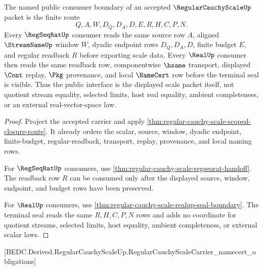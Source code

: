 \begin{theorem}
\label{thm:regular-cauchy-scale-public-consumer-boundary}
The named public consumer boundary of an accepted $\RegularCauchyScaleUp$ packet is the finite route
$$
Q,A,W,D_Q,D_A,D,E,R,H,C,P,N.
$$
Every $\RegSeqRatUp$ consumer reads the same source row $A$, aligned $\StreamNameUp$ window $W$, dyadic endpoint rows $D_Q,D_A,D$, finite budget $E$, and regular readback $R$ before exporting scale data. Every $\RealUp$ consumer then reads the same readback row, componentwise $\hsame$ transport, displayed $\Cont$ replay, $\Pkg$ provenance, and local $\NameCert$ row before the terminal seal is visible. Thus the public interface is the displayed scale packet itself, not quotient stream equality, selected limits, host real equality, ambient completeness, or an external real-vector-space law.
\end{theorem}
\begin{proof}
Project the accepted carrier and apply \autoref{thm:regular-cauchy-scale-scoped-closure-route}. It already orders the scalar, source, window, dyadic endpoint, finite-budget, regular-readback, transport, replay, provenance, and local naming rows.

For $\RegSeqRatUp$ consumers, use \autoref{thm:regular-cauchy-scale-regseqrat-handoff}. The readback row $R$ can be consumed only after the displayed source, window, endpoint, and budget rows have been preserved.

For $\RealUp$ consumers, use \autoref{thm:regular-cauchy-scale-realup-seal-boundary}. The terminal seal reads the same $R,H,C,P,N$ rows and adds no coordinate for quotient streams, selected limits, host equality, ambient completeness, or external scalar laws.
\end{proof}

[BEDC.Derived.RegularCauchyScaleUp.RegularCauchyScaleCarrier\_namecert\_obligations]

